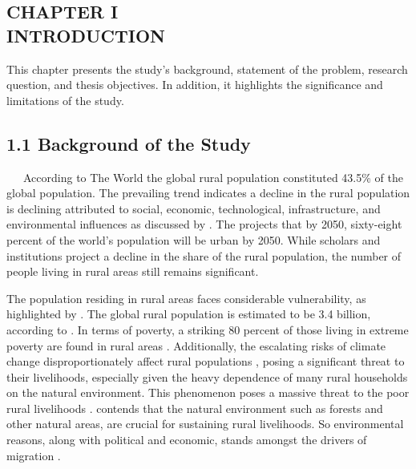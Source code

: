 \documentclass[12pt, a4paper]{article}
\begin{document}
\renewcommand{\thefootnote}{\fnsymbol{footnote}}
\clearpage %
\begin{center}
\section*{\large{CHAPTER I \\ \vspace{-0.3cm} INTRODUCTION}}
\end{center}
\renewcommand{\thepage}{\arabic{page}} 
\setcounter{page}{1}
This chapter presents the study’s background, statement of the problem,
research question, and thesis objectives. In addition, it highlights the significance
and limitations of the study.\\
\subsection*{1.1 Background of the Study}
\renewcommand{\thepage}{\arabic{page}} 
\ \ \ According to The World \cite{world2018rural} the global rural population constituted 43.5\% 
of the global population. The prevailing trend indicates a decline in the rural population is declining attributed to social, economic, technological, infrastructure, and environmental influences as discussed by \citep{jaszczak2018phenomenon}. The \cite{UNDP} projects that by 2050, sixty-eight percent of the world’s population will be urban by 2050.
While scholars and institutions project a decline in the share of the rural population, the number of people living in rural areas still remains significant.

The population residing in rural areas faces considerable vulnerability, as highlighted by \cite{acharya2008dimension}. The global rural population is estimated to be 3.4 billion, according to \cite{Worldbank2022}. In terms of poverty, a striking 80 percent of those living in extreme poverty are found in rural areas \citep{world2021state}. Additionally, the escalating risks of climate change disproportionately affect rural populations \citep{Researchoverview2022}, posing a significant threat to their livelihoods, especially given the heavy dependence of many rural households on the natural environment. This phenomenon poses a massive threat to the poor rural livelihoods \citep{pelser2022climate}. \cite{angelsen2014environmental} contends that the natural environment such as forests and other natural areas, are crucial for sustaining rural livelihoods. So environmental reasons, along with political and economic, stands amongst the drivers of migration \citep{mcnamara2016insecure}.
\end{document}
